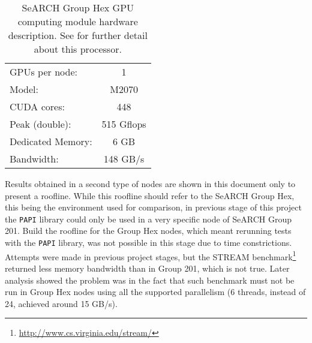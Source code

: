 \begin{table}[!htp]
	\begin{center}
		\begin{tabular}{lc}
			\hline
			GPUs per node: & 1	\\
			Model: & \tesla M2070\\
			CUDA cores: & 448	\\
			Peak (double): & 515 Gflops	\\
			\hline
			Dedicated Memory: & 6 GB	\\
			Bandwidth: & 148 GB/s\\
			\hline
		\end{tabular}
		\caption[SeARCH Group Hex GPU computing module hardware description]{SeARCH Group Hex GPU computing module hardware description. See \cite{teslaM2070} for further detail about this processor.}
		\label{tab:grouphex}
	\end{center}
\end{table}

Results obtained in a second type of nodes are shown in this document only to present a roofline.
While this roofline should refer to the SeARCH Group Hex, this being the environment used for comparison, in previous stage of this project the \texttt{PAPI} library could only be used in a very specific node of SeARCH Group 201.
Build the roofline for the Group Hex nodes, which meant rerunning tests with the \texttt{PAPI} library, was not possible in this stage due to time constrictions.
Attempts were made in previous project stages, but the STREAM benchmark\footnote{\url{http://www.cs.virginia.edu/stream/}} returned less memory bandwidth than in Group 201, which is not true.
Later analysis showed the problem was in the fact that such benchmark must not be run in Group Hex nodes using all the supported parallelism (6 threads, instead of 24, achieved around 15 GB/s).